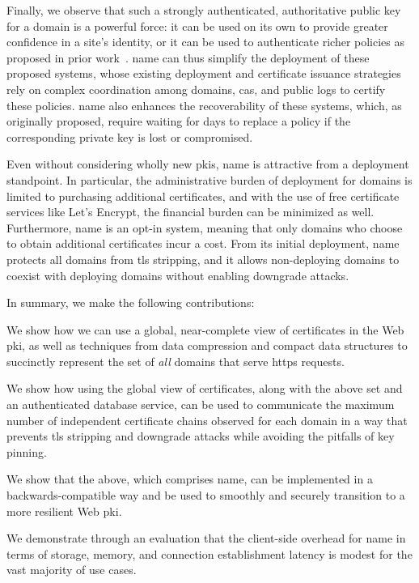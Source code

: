 Finally, we observe that such a strongly authenticated, authoritative public key
for a domain is a powerful force: it can be used on its own to provide greater
confidence in a site's identity, or it can be used to authenticate richer
policies as proposed in prior work~\cite{basin2014arpki,
szalachowski2014policert}. \ac{name} can thus simplify the deployment of these
proposed systems, whose existing deployment and certificate issuance strategies
rely on complex coordination among domains, \acp{ca}, and public logs to certify
these policies. \ac{name} also enhances the recoverability of these systems,
which, as originally proposed, require waiting for days to replace a policy if
the corresponding private key is lost or compromised.

Even without considering wholly new \acp{pki}, \ac{name} is attractive from a
deployment standpoint. In particular, the administrative burden of deployment
for domains is limited to purchasing additional certificates, and with the use
of free certificate services like Let's
Encrypt, the financial burden can be
minimized as well. Furthermore, \ac{name} is an opt-in system, meaning that only
domains who choose to obtain additional certificates incur a cost. From its
initial deployment, \ac{name} protects all domains from \ac{tls} stripping, and
it allows non-deploying domains to coexist with deploying domains without
enabling downgrade attacks.

In summary, we make the following contributions:
\begin{compactitem}
\item We show how we can use a global, near-complete view of certificates in the
  Web \ac{pki}, as well as techniques from data compression and compact data
  structures to succinctly represent the set of \emph{all} domains that serve
  \ac{https} requests.
\item We show how using the global view of certificates, along with the above
  set and an authenticated database service, can be used to communicate the
  maximum number of independent certificate chains observed for each domain in a
  way that prevents \ac{tls} stripping and downgrade attacks while avoiding the
  pitfalls of key pinning.
\item We show that the above, which comprises \ac{name}, can be implemented in a
  backwards-compatible way and be used to smoothly and securely transition to a
  more resilient Web \ac{pki}.
\item We demonstrate through an evaluation that the client-side overhead for
  \ac{name} in terms of storage, memory, and connection establishment latency is
  modest for the vast majority of use cases.
\end{compactitem}

